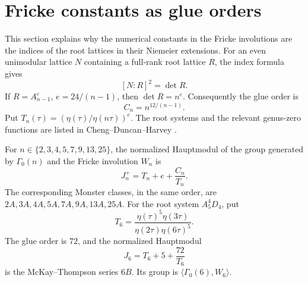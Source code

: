 \section{Fricke constants as glue orders}
This section explains why the numerical constants in the Fricke involutions
are the indices of the root lattices in their Niemeier extensions.
For an even unimodular lattice \(N\) containing a full-rank root lattice
\(R\), the index formula gives
\[
 [N:R]^2=\det R.
\]
If \(R=A_{n-1}^{e}\), \(e=24/(n-1)\), then \(\det R=n^e\).
Consequently the glue order is
\[
 C_n=n^{12/(n-1)}.
\]
Put \(T_n(\tau)=(\eta(\tau)/\eta(n\tau))^e\).
The root systems and the relevant genus-zero functions are listed in
Cheng--Duncan--Harvey \cite[Sect.~2.2, Table~1]{CDH2014}.

\begin{theorem}\label{thm:fricke-glue}
For \(n\in\{2,3,4,5,7,9,13,25\}\), the normalized Hauptmodul of
the group generated by \(\Gamma_0(n)\) and the Fricke involution \(W_n\) is
\[
 J_n^+=T_n+e+\frac{C_n}{T_n}.
\]
The corresponding Monster classes, in the same order, are
\(2A,3A,4A,5A,7A,9A,13A,25A\).
For the root system \(A_5^4D_4\), put
\[
 T_6=\frac{\eta(\tau)^5\eta(3\tau)}
              {\eta(2\tau)\eta(6\tau)^5}.
\]
The glue order is \(72\), and the normalized Hauptmodul
\[
 J_6=T_6+5+\frac{72}{T_6}
\]
is the McKay--Thompson series \(6B\). Its group is
\(\langle\Gamma_0(6),W_6\rangle\).
\end{theorem}
